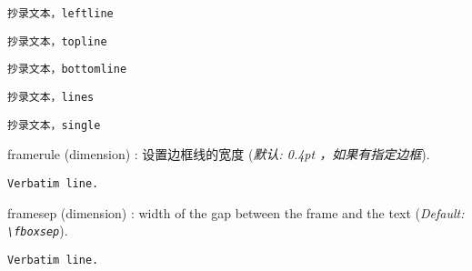 \documentclass[twoside]{article}
\newcommand\cs[1]{\texttt{\textbackslash#1}}
\providecommand\optname[1]{\textsf{#1}}
\newenvironment{optlist}{\begin{description}%
  \renewcommand\makelabel[1]{%
    \descriptionlabel{\mdseries\optname{##1}}}%
  \itemsep0.25\itemsep}%
 {\end{description}}
\begin{document}
\begin{SideBySideExample}
  \begin{Verbatim}[frame=leftline]
    抄录文本，leftline
  \end{Verbatim}
\end{SideBySideExample}

\begin{SideBySideExample}
  \begin{Verbatim}[frame=topline]
    抄录文本，topline
  \end{Verbatim}
\end{SideBySideExample}

\begin{SideBySideExample}
  \begin{Verbatim}[frame=bottomline]
    抄录文本，bottomline
  \end{Verbatim}
\end{SideBySideExample}

\begin{SideBySideExample}
  \begin{Verbatim}[frame=lines]
    抄录文本，lines
  \end{Verbatim}
\end{SideBySideExample}

\begin{SideBySideExample}
  \begin{Verbatim}[frame=single]
    抄录文本，single
  \end{Verbatim}
\end{SideBySideExample}

\begin{optlist}
  \item[framerule (dimension)]: 设置边框线的宽度
  (\emph{默认: 0.4pt ，如果有指定边框}).
\end{optlist}

\begin{SideBySideExample}
  \begin{Verbatim}[frame=single,
                   framerule=1mm]
    Verbatim line.
  \end{Verbatim}
\end{SideBySideExample}

\begin{optlist}
  \item[framesep (dimension)]: width of the gap between the frame and
  the text (\emph{Default: \cs{fboxsep}}).
\end{optlist}

\begin{SideBySideExample}
  \begin{Verbatim}[frame=single,
                   framesep=5mm]
    Verbatim line.
  \end{Verbatim}
\end{SideBySideExample}
\end{document}
